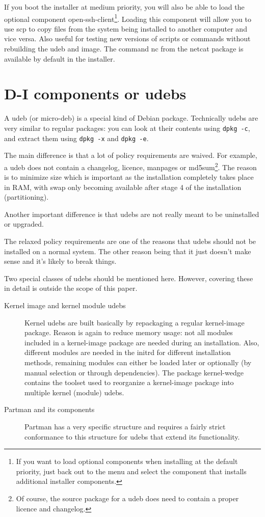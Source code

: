 \documentclass[a4paper,10pt]{article}
\begin{document}
If you boot the installer at medium priority, you will also be able to load the optional component open-ssh-client\footnote{If you want to load optional components when installing at the default priority, just back out to the menu and select the component that installs additional installer components.}. Loading this component will allow you to use scp to copy files from the system being installed to another computer and vice versa. Also useful for testing new versions of scripts or commands without rebuilding the udeb and image. The command nc from the netcat package is available by default in the installer. 

\section{D-I components or udebs}
A udeb (or micro-deb) is a special kind of Debian package. Technically udebs are very similar to regular packages: you can look at their contents using \texttt{dpkg -c}, and extract them using \texttt{dpkg -x} and \texttt{dpkg -e}. 

The main difference is that a lot of policy requirements are waived. For example, a udeb does not contain a changelog, licence, manpages or md5sum\footnote{Of course, the source package for a udeb does need to contain a proper licence and changelog.}. The reason is to minimize size which is important as the installation completely takes place in RAM, with swap only becoming available after stage 4 of the installation (partitioning). 

Another important difference is that udebs are not really meant to be uninstalled or upgraded. 

The relaxed policy requirements are one of the reasons that udebs should not be installed on a normal system. The other reason being that it just doesn't make sense and it's likely to break things. 

Two special classes of udebs should be mentioned here. However, covering these in detail is outside the scope of this paper. 

\begin{description}
\item[Kernel image and kernel module udebs]
Kernel udebs are built basically by repackaging a regular kernel-image package. Reason is again to reduce memory usage: not all modules included in a kernel-image package are needed during an installation. Also, different modules are needed in the initrd for different installation methods, remaining modules can either be loaded later or optionally (by manual selection or through dependencies). The package kernel-wedge contains the toolset used to reorganize a kernel-image package into multiple kernel (module) udebs. 
\item[Partman and its components]
Partman has a very specific structure and requires a fairly strict conformance to this structure for udebs that extend its functionality. 
\end{description}
\end{document}
